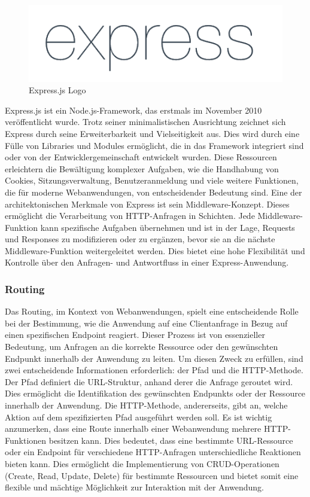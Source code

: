 \begin{figure}
    \centering
    \includegraphics[width=0.8\linewidth]{pics/express_logo.png}
    \caption{Express.js Logo}
    \label{fig:enter-label}
\end{figure}
Express.js ist ein Node.js-Framework, das erstmals im November 2010 veröffentlicht wurde. Trotz seiner minimalistischen Ausrichtung zeichnet sich Express durch seine Erweiterbarkeit und Vielseitigkeit aus. Dies wird durch eine Fülle von Libraries und Modules ermöglicht, die in das Framework integriert sind oder von der Entwicklergemeinschaft entwickelt wurden. Diese Ressourcen erleichtern die Bewältigung komplexer Aufgaben, wie die Handhabung von Cookies, Sitzungsverwaltung, Benutzeranmeldung und viele weitere Funktionen, die für moderne Webanwendungen, von entscheidender Bedeutung sind.
\newline
Eine der architektonischen Merkmale von Express ist sein Middleware-Konzept. Dieses ermöglicht die Verarbeitung von HTTP-Anfragen in Schichten. Jede Middleware-Funktion kann spezifische Aufgaben übernehmen und ist in der Lage, Requests und Responses zu modifizieren oder zu ergänzen, bevor sie an die nächste Middleware-Funktion weitergeleitet werden. Dies bietet eine hohe Flexibilität und Kontrolle über den Anfragen- und Antwortfluss in einer Express-Anwendung.
\cite{Express_js_Introduction}

\subsubsection{Routing}
Das Routing, im Kontext von Webanwendungen, spielt eine entscheidende Rolle bei der Bestimmung, wie die Anwendung auf eine Clientanfrage in Bezug auf einen spezifischen Endpoint reagiert. Dieser Prozess ist von essenzieller Bedeutung, um Anfragen an die korrekte Ressource oder den gewünschten Endpunkt innerhalb der Anwendung zu leiten. Um diesen Zweck zu erfüllen, sind zwei entscheidende Informationen erforderlich: der Pfad und die HTTP-Methode.
\newline
Der Pfad definiert die URL-Struktur, anhand derer die Anfrage geroutet wird. Dies ermöglicht die Identifikation des gewünschten Endpunkts oder der Ressource innerhalb der Anwendung. Die HTTP-Methode, andererseits, gibt an, welche Aktion auf dem spezifizierten Pfad ausgeführt werden soll. Es ist wichtig anzumerken, dass eine Route innerhalb einer Webanwendung mehrere HTTP-Funktionen besitzen kann. Dies bedeutet, dass eine bestimmte URL-Ressource oder ein Endpoint für verschiedene HTTP-Anfragen unterschiedliche Reaktionen bieten kann. Dies ermöglicht die Implementierung von CRUD-Operationen (Create, Read, Update, Delete) für bestimmte Ressourcen und bietet somit eine flexible und mächtige Möglichkeit zur Interaktion mit der Anwendung.
\cite{Express_js_basic_routing}
\cite{Express_js_routing}

